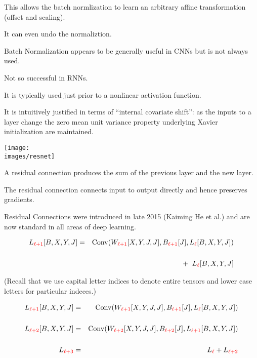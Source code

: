 {\vfill
This allows the batch normlization to learn an arbitrary affine transformation (offset and scaling).

\vfill
It can even undo the normaliztion.


Batch Normalization appears to be generally useful in CNNs but is not always used.

\vfill
Not so successful in RNNs.

\vfill
It is typically used just prior to a nonlinear activation function.

\vfill
It is intuitively justified in terms of ``internal covariate shift'':
as the inputs to a layer change the zero mean unit variance property underlying Xavier initialization are maintained.


\vfill
\texttt{[image: \\images/resnet]}
\hfill \begin{minipage}[b]{4in}
  A residual connection produces the sum of the previous layer and the new layer.

  \bigskip
  The residual connection connects input to output directly and hence preserves gradients.

  \bigskip
  Residual Connections were introduced in late 2015 (Kaiming He et al.) and are now standard in all areas of deep learning.
\end{minipage}


\medskip
\begin{eqnarray*}
L_{\color{red} \ell+1}[B,X,Y,J] & = & \mathrm{Conv}(W_{\color{red} \ell+1}[X,Y,J,J],B_{\color{red} \ell+1}[J],L_{\color{red} \ell}[B,X,Y,J]) \\
\\
& & + \;\; L_{\color{red} \ell}[B,X,Y,J]
\end{eqnarray*}

\vfill (Recall that we use capital letter indices to denote entire tensors and lower case letters for particular indeces.)


\begin{eqnarray*}
L_{\color{red} \ell+1}[B,X,Y,J] & = & \mathrm{Conv}(W_{\color{red} \ell+1}[X,Y,J,J],B_{\color{red} \ell+1}[J],L_{\color{red} \ell}[B,X,Y,J]) \\
\\
L_{\color{red} \ell+2}[B,X,Y,J] & = & \mathrm{Conv}(W_{\color{red} \ell+2}[X,Y,J,J],B_{\color{red} \ell+2}[J],L_{\color{red} \ell+1}[B,X,Y,J]) \\
\\
L_{\color{red} \ell+3} & = & L_{\color{red} \ell} + L_{\color{red} \ell+2}
\end{eqnarray*}

}
